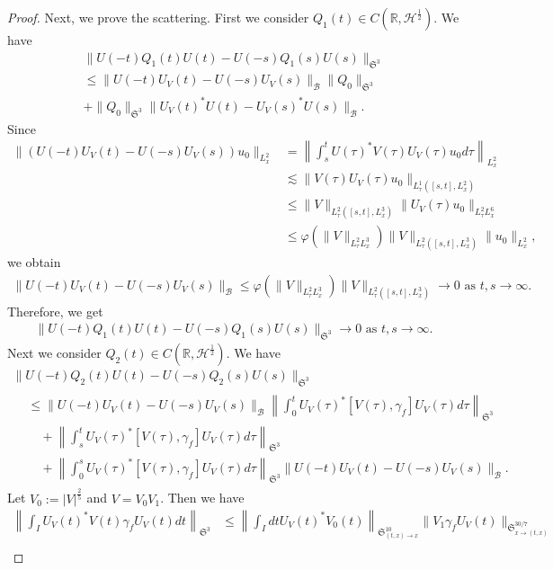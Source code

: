 \documentclass[10pt,a4paper]{amsart}
\providecommand{\No}[1]{\left\| #1 \right\|}
\newcommand{\BR}{\mathbb{R}}
\newcommand{\CB}{\mathcal{B}}
\newcommand{\CH}{\mathcal{H}}
\newcommand{\FS}{\mathfrak{S}}
\newcommand{\ga}{\gamma}
\newcommand{\ph}{\varphi}
\newcommand{\ta}{\tau}
\renewcommand{\No}[1]{\left\| #1 \right\|}
\newcommand{\I}{\infty}
\newcommand{\tx}{{t,x}}
\newcommand{\tw}{\frac{1}{2}}
\newcommand{\ls}{\lesssim}
\begin{document}
\begin{proof}
Next, we prove the scattering. First we consider $Q_1(t) \in C(\BR,\CH^\tw)$. We have
\begin{multline}
\|U(-t)Q_1(t)U(t)-U(-s)Q_1(s)U(s)\|_{\FS^3} \\
\le \|U(-t)U_V(t)-U(-s)U_V(s)\|_{\CB} \|Q_0\|_{\FS^3}\\
+\|Q_0\|_{\FS^3} \big\|U_V(t)^*U(t)-U_V(s)^*U(s)\big\|_{\CB}.
\end{multline}
Since
\begin{equation}
\begin{split}
\|(U(-t)U_V(t)-U(-s)U_V(s))u_0\|_{L^2_x}
&= \No{ \int_s^t U(\ta)^* V(\ta) U_V(\ta) u_0 d\ta }_{L^2_x} \\
&\ls \|V(\ta) U_V(\ta)u_0\|_{L^1_\ta\left([s,t],L^2_x\right)} \\
&\le \|V\|_{L^2_\ta\left([s,t], L^3_x\right)} \|U_V(\ta)u_0\|_{L^2_\ta L^6_x} \\
&\le \ph\left(\|V\|_{L^2_\ta L^3_x}\right) \|V\|_{L^2_\ta\left([s,t], L^3_x\right)} \|u_0\|_{L^2_x},
\end{split}
\end{equation}
we obtain
\begin{align}\label{sc}
\|U(-t)U_V(t)-U(-s)U_V(s)\|_\CB \le \ph(\|V\|_{L^2_\ta L^3_x}) \|V\|_{L^2_\ta([s,t], L^3_x)} \to 0
\text{ as } t,s \to \I.
\end{align}
Therefore, we get
\begin{align}
\|U(-t)Q_1(t)U(t)-U(-s)Q_1(s)U(s)\|_{\FS^3} \to 0 \text{ as } t,s \to \I.
\end{align}
Next we consider $Q_2(t) \in C(\BR,\CH^\tw)$. We have
\begin{multline}
\|U(-t)Q_2(t)U(t)-U(-s)Q_2(s)U(s)\|_{\FS^3} \\
\begin{aligned}
&\le \|U(-t)U_V(t)-U(-s)U_V(s)\|_\CB
\No{\int_0^t U_V(\ta)^* [V(\ta),\ga_f]U_V(\ta) d\ta}_{\FS^3} \\
&\quad + \No{ \int_s^t U_V(\ta)^*[V(\ta),\ga_f] U_V(\ta) d\ta }_{\FS^3} \\
&\quad + \No{\int_0^s U_V(\ta)^* [V(\ta),\ga_f]U_V(\ta) d\ta}_{\FS^3}
\|U(-t)U_V(t)-U(-s)U_V(s)\|_\CB.
\end{aligned}
\end{multline}
Let $V_0 := |V|^{\frac{2}{5}}$ and $V = V_0 V_1$. Then we have
\begin{equation}
\begin{split}
\No{\int_I U_V(t)^*V(t)\ga_f U_V(t) dt}_{\FS^3} &\le \No{\int_I dt U_V(t)^* V_0(t) }_{\FS^{10}_{(\tx)\to x}} \|V_1 \ga_f U_V(t)\|_{\FS^{30/7}_{x \to(t,x)}} \\

\end{split}
\end{equation}
\end{proof}
\end{document}
